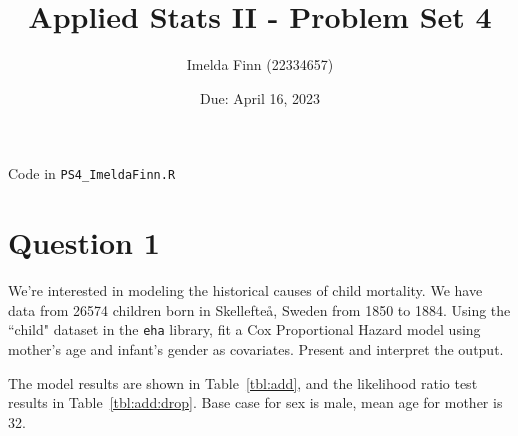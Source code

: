 \documentclass[12pt,letterpaper]{article}
\title{Applied Stats II - Problem Set 4}
\date{Due: April 16, 2023}
\author{Imelda Finn (22334657)}
\begin{document}
	\maketitle

	Code in \texttt{PS4\_ImeldaFinn.R}

\section*{Question 1}
\vspace{.25cm}
\noindent We're interested in modeling the historical causes of child mortality. We have data from 26574 children born in Skellefteå, Sweden from 1850 to 1884. Using the ``child" dataset in the \texttt{eha} library, fit a Cox Proportional Hazard model using mother's age and infant's gender as covariates. Present and interpret the output.

%  
  
The model results are shown in Table~\ref{tbl:add}, and the likelihood ratio test results in Table~\ref{tbl:add:drop}.  %
Base case for sex is male, mean age for mother is 32.
\end{document}
